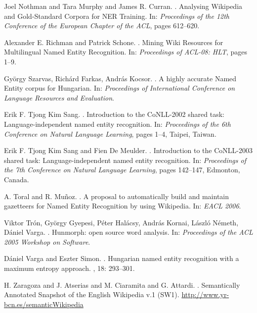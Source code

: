 \documentclass[11pt]{article}
\begin{document}
\begin{thebibliography}{}
Joel Nothman and Tara Murphy and James R. Curran.
.
\newblock Analysing Wikipedia and Gold-Standard Corpora for NER Training.
\newblock In: {\em Proceedings of the 12th Conference of the European Chapter of the ACL}, pages 612--620.

Alexander E. Richman and Patrick Schone.
.
\newblock Mining Wiki Resources for Multilingual Named Entity Recognition.
\newblock In: {\em Proceedings of ACL-08: HLT}, pages 1--9.

György Szarvas, Richárd Farkas, András Kocsor.
.
\newblock A highly accurate Named Entity corpus for Hungarian. 
\newblock In: {\em Proceedings of International Conference on Language Resources and Evaluation}.

Erik F. Tjong Kim Sang.
.
\newblock Introduction to the CoNLL-2002 shared task: Language-independent named entity recognition.
\newblock In: {\em Proceedings of the 6th Conference on Natural Language Learning}, pages 1--4, Taipei, Taiwan.

Erik F. Tjong Kim Sang and Fien De Meulder.
.
\newblock Introduction to the CoNLL-2003 shared task: Language-independent named entity recognition. 
\newblock In: {\em Proceedings of the 7th Conference on Natural Language Learning}, pages 142--147, Edmonton, Canada.

A. Toral and R. Mu\~noz.
.
\newblock A proposal to automatically build and maintain gazetteers for Named Entity Recognition by using Wikipedia.
\newblock In: {\em EACL 2006}.

Viktor Trón, György Gyepesi, Péter Halácsy, András Kornai, László Németh, Dániel Varga.
.
\newblock Hunmorph: open source word analysis.
\newblock In: {\em Proceedings of the ACL 2005 Workshop on Software}. 

Dániel Varga and Eszter Simon.
.
\newblock Hungarian named entity recognition with a maximum entropy approach.
, 18: 293--301.

H. Zaragoza and J. Atserias and M. Ciaramita and G. Attardi.
.
\newblock Semantically Annotated Snapshot of the English Wikipedia v.1 (SW1).
\newblock \url{http://www.yr-bcn.es/semanticWikipedia}


\end{thebibliography}
\end{document}
